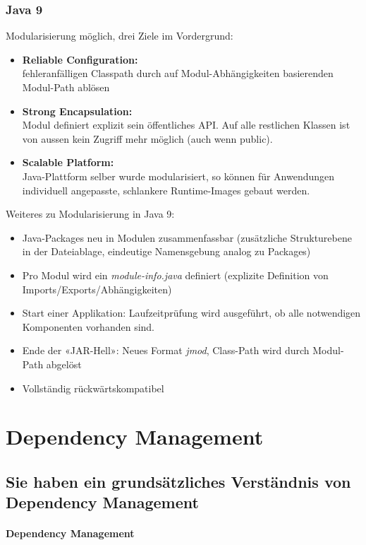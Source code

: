 \documentclass[a4paper]{article}
\begin{document}
	\subsubsection{Java 9}
	Modularisierung möglich, drei Ziele im Vordergrund:
	\begin{itemize}
		\setlength\itemsep{0em}
		\item \textbf{Reliable Configuration:} \\
		fehleranfälligen Classpath durch auf Modul-Abhängigkeiten basierenden Modul-Path ablösen
		\item \textbf{Strong Encapsulation:} \\
		Modul definiert explizit sein öffentliches API. 
		Auf alle restlichen Klassen ist von aussen kein Zugriff mehr möglich (auch wenn public).
		\item \textbf{Scalable Platform:} \\
		Java-Plattform selber wurde modularisiert, so können für Anwendungen individuell angepasste, schlankere Runtime-Images gebaut werden.
	\end{itemize}
	Weiteres zu Modularisierung in Java 9:
	\begin{itemize}
		\setlength\itemsep{0em}
		\item Java-Packages neu in Modulen zusammenfassbar (zusätzliche Strukturebene in der Dateiablage, eindeutige Namensgebung analog zu Packages)
		\item Pro Modul wird ein \textit{module-info.java} definiert (explizite Definition von Imports/Exports/Abhängigkeiten)
		\item Start einer Applikation: Laufzeitprüfung wird ausgeführt, ob alle notwendigen Komponenten vorhanden sind.
		\item Ende der «JAR-Hell»: Neues Format \textit{jmod}, Class-Path wird durch Modul-Path abgelöst
		\item Vollständig rückwärtskompatibel
	\end{itemize}

\newpage
\section{Dependency Management}

	\subsection{Sie haben ein grundsätzliches Verständnis von Dependency Management}
	
	\paragraph{Dependency Management}
	
\end{document}
